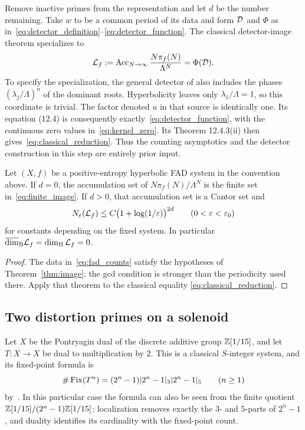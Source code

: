 Remove inactive primes from the representation and let $d$ be the number
remaining. Take $w$ to be a common period of its data and form $\mathcal D$ and
$\Phi$ as in~\eqref{eq:detector_definition}--\eqref{eq:detector_function}.
The classical detector-image theorem specializes to
\begin{equation}\label{eq:classical_reduction}
 \mathcal L_f:=\operatorname{Acc}_{N\to\infty}
       \frac{N\pi_f(N)}{\Lambda^N}=\Phi(\mathcal D).
\end{equation}
To specify the specialization, the general detector of
\cite[Definition 12.4.1]{bch2024} also includes the phases
$(\lambda_j/\Lambda)^n$ of the dominant roots. Hyperbolicity leaves only
$\lambda_1/\Lambda=1$, so this coordinate is trivial.
The factor denoted $u$ in that source is identically one. Its equation
(12.4) is consequently exactly~\eqref{eq:detector_function}, with the
continuous zero values in~\eqref{eq:kernel_zero}. Its Theorem 12.4.3(ii)
then gives~\eqref{eq:classical_reduction}. Thus the counting asymptotics
and the detector construction in this step are entirely prior input.

\begin{corollary}\label{cor:fad}
Let $(X,f)$ be a positive-entropy hyperbolic FAD system in the convention
above. If $d=0$, the accumulation set of $N\pi_f(N)/\Lambda^N$ is the
finite set in~\eqref{eq:finite_image}. If $d>0$, that accumulation set
is a Cantor set and
\begin{equation}\label{eq:dynamical_cover}
 N_{\varepsilon}(\mathcal L_f)\leq C\bigl(1+\log(1/\varepsilon)\bigr)^{2d}
 \qquad(0<\varepsilon<\varepsilon_0)
\end{equation}
for constants depending on the fixed system. In particular
$\overline{\dim}_{\mathrm B}\mathcal L_f=\dim_{\mathrm H}\mathcal L_f=0$.
\end{corollary}

\begin{proof}
The data in~\eqref{eq:fad_counts} satisfy the hypotheses of
Theorem~\ref{thm:image}; the gcd condition is stronger than the
periodicity used there. Apply that theorem to the classical equality
\eqref{eq:classical_reduction}.
\end{proof}

\subsection{Two distortion primes on a solenoid}

Let $X$ be the Pontryagin dual of the discrete additive group $\mathbb Z[1/15]$,
and let $T:X\to X$ be dual to multiplication by $2$.
This is a classical $S$-integer system, and its fixed-point formula is
\begin{equation}\label{eq:solenoid_count}
 \#\operatorname{Fix}(T^n)=(2^n-1)|2^n-1|_3|2^n-1|_5
 \qquad(n\geq1)
\end{equation}
by~\cite[Definition 9.1.2 and Proposition 9.1.4]{bch2024}.
In this particular case the formula can also be seen from the finite
quotient $\mathbb Z[1/15]/(2^n-1)\mathbb Z[1/15]$: localization removes exactly the
$3$- and $5$-parts of $2^n-1$, and duality identifies its cardinality with
the fixed-point count.

